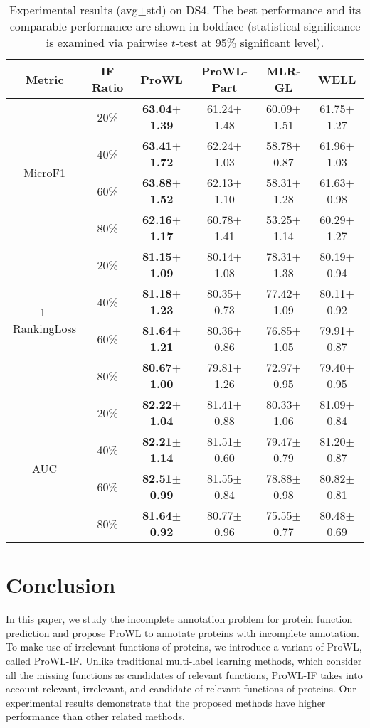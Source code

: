 \documentclass{llncs} %
\begin{document}
\begin{table*}[h!]
\scriptsize
\caption{Experimental results (avg$\pm$std) on DS4. The best performance and its comparable performance are shown in boldface (statistical significance is examined via pairwise $t$-test at 95\% significant level).}
\centering
\begin{tabular}{|c| c| c| c| c| c|}
\hline
Metric &IF Ratio &ProWL &ProWL-Part &MLR-GL &WELL\\
\hline
\multirow{4}{*}{MicroF1}
& 20\% &\bf 63.04$\pm$1.39 &61.24$\pm$1.48 &60.09$\pm$1.51 &61.75$\pm$1.27\\
& 40\% &\bf 63.41$\pm$1.72 &62.24$\pm$1.03 &58.78$\pm$0.87 &61.96$\pm$1.03\\
& 60\% &\bf 63.88$\pm$1.52 &62.13$\pm$1.10 &58.31$\pm$1.28 &61.63$\pm$0.98\\
& 80\% &\bf 62.16$\pm$1.17 &60.78$\pm$1.41 &53.25$\pm$1.14 &60.29$\pm$1.27\\
\hline
\multirow{4}{*}{1-RankingLoss}
& 20\% &\bf 81.15$\pm$1.09 &80.14$\pm$1.08 &78.31$\pm$1.38 &80.19$\pm$0.94\\
& 40\% &\bf 81.18$\pm$1.23 &80.35$\pm$0.73 &77.42$\pm$1.09 &80.11$\pm$0.92\\
& 60\% &\bf 81.64$\pm$1.21 &80.36$\pm$0.86 &76.85$\pm$1.05 &79.91$\pm$0.87\\
& 80\% &\bf 80.67$\pm$1.00 &79.81$\pm$1.26 &72.97$\pm$0.95 &79.40$\pm$0.95\\
\hline
\multirow{4}{*}{AUC}
& 20\% &\bf 82.22$\pm$1.04 &81.41$\pm$0.88 &80.33$\pm$1.06 &81.09$\pm$0.84\\
& 40\% &\bf 82.21$\pm$1.14 &81.51$\pm$0.60 &79.47$\pm$0.79 &81.20$\pm$0.87\\
& 60\% &\bf 82.51$\pm$0.99 &81.55$\pm$0.84 &78.88$\pm$0.98 &80.82$\pm$0.81\\
& 80\% &\bf 81.64$\pm$0.92 &80.77$\pm$0.96 &75.55$\pm$0.77 &80.48$\pm$0.69\\
\hline
\end{tabular}
\label{Table5}
\end{table*}
\section{Conclusion}
\label{conclusion}
In this paper, we study the incomplete annotation problem for protein function prediction and propose ProWL to annotate proteins with incomplete annotation. To make use of irrelevant functions of proteins, we introduce a variant of ProWL, called ProWL-IF. Unlike traditional multi-label learning methods, which consider all the missing functions as candidates of relevant functions, ProWL-IF takes into account relevant, irrelevant,  and candidate of relevant functions of proteins. Our experimental results demonstrate that the proposed methods have higher performance than other related methods.
\end{document}
